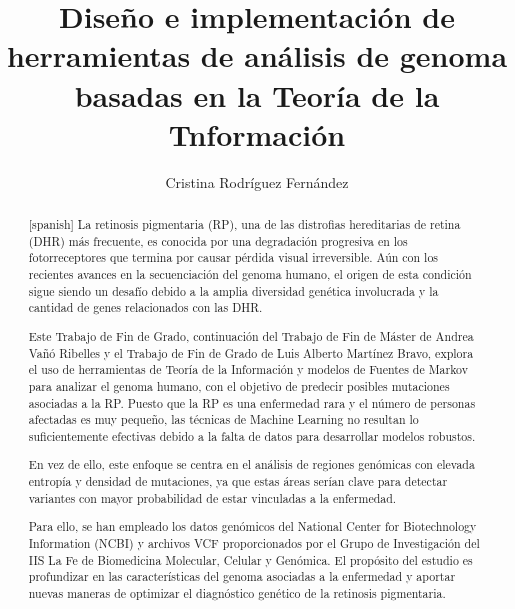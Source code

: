 \documentclass[11pt,spanish,listoffigures,listoftables]{tfgetsinf}
\title{Diseño e implementación de herramientas de análisis de genoma basadas en la Teoría de la Tnformación}
\author{Cristina Rodríguez Fernández}
\begin{document}

\begin{abstract}[spanish]
   La retinosis pigmentaria (RP), una de las distrofias hereditarias de retina (DHR) más frecuente, es conocida por una degradación progresiva en los fotorreceptores que termina por causar pérdida visual irreversible. Aún con los recientes avances en la secuenciación del genoma humano, el origen de esta condición sigue siendo un desafío debido a la amplia diversidad genética involucrada y la cantidad de genes relacionados con las DHR.

   Este Trabajo de Fin de Grado, continuación del Trabajo de Fin de Máster de Andrea Vañó Ribelles y el Trabajo de Fin de Grado de Luis Alberto Martínez Bravo, explora el uso de herramientas de Teoría de la Información y modelos de Fuentes de Markov para analizar el genoma humano, con el objetivo de predecir posibles mutaciones asociadas a la RP. Puesto que la RP es una enfermedad rara y el número de personas afectadas es muy pequeño, las técnicas de Machine Learning no resultan lo suficientemente efectivas debido a la falta de datos para desarrollar modelos robustos.

   En vez de ello, este enfoque se centra en el análisis de regiones genómicas con elevada entropía y densidad de mutaciones, ya que estas áreas serían clave para detectar variantes con mayor probabilidad de estar vinculadas a la enfermedad.

   Para ello, se han empleado los datos genómicos del National Center for Biotechnology Information (NCBI) y archivos VCF proporcionados por el Grupo de Investigación del IIS La Fe de Biomedicina Molecular, Celular y Genómica. El propósito del estudio es profundizar en las características del genoma asociadas a la enfermedad y aportar nuevas maneras de optimizar el diagnóstico genético de la retinosis pigmentaria.
   \\
   \\
\end{abstract}
\end{document}
